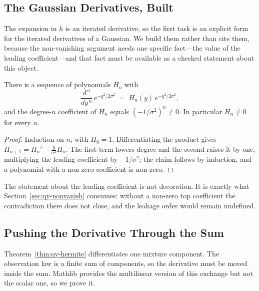 \subsection{The Gaussian Derivatives, Built}
\label{sec:qy-hermite}

The expansion in $h$ is an iterated derivative, so the first task is an explicit form for the
iterated derivatives of a Gaussian. We build them rather than cite them, because the
non-vanishing argument needs one specific fact---the value of the leading coefficient---and
that fact must be available as a checked statement about this object.

\begin{theorem}
\label{thm:qy-hermite}
There is a sequence of polynomials $H_{n}$ with
\begin{equation}
\frac{d^{\,n}}{dy^{\,n}}\,e^{-y^{2}/2\sigma^{2}}
   \;=\;H_{n}(y)\,e^{-y^{2}/2\sigma^{2}},
\label{eq:qy-hermite}
\end{equation}
and the degree-$n$ coefficient of $H_{n}$ equals $(-1/\sigma^{2})^{n}\neq0$. In particular
$H_{n}\neq0$ for every $n$.
\end{theorem}

\begin{proof}
Induction on $n$, with $H_{0}=1$. Differentiating the product gives
$H_{n+1}=H_{n}'-\tfrac{y}{\sigma^{2}}H_{n}$. The first term lowers degree and the second
raises it by one, multiplying the leading coefficient by $-1/\sigma^{2}$; the claim follows
by induction, and a polynomial with a non-zero coefficient is non-zero.
\end{proof}


The statement about the leading coefficient is not decoration. It is exactly what
Section~\ref{sec:qy-nonvanish} consumes: without a non-zero top coefficient the contradiction
there does not close, and the leakage order would remain undefined.

\subsection{Pushing the Derivative Through the Sum}
\label{sec:qy-assembly}

Theorem~\ref{thm:qy-hermite} differentiates one mixture component. The observation law is a
finite sum of components, so the derivative must be moved inside the sum. Mathlib provides
the multilinear version of this exchange but not the scalar one, so we prove it.

